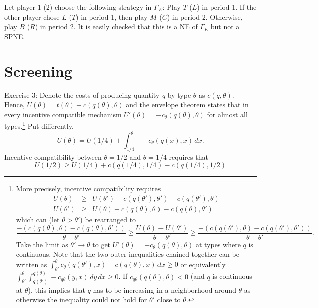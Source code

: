 \documentclass[a4paper,11pt]{article}
\begin{document}
Let player 1 (2) choose the following strategy in $\Gamma_E$: Play $T$ ($L$) in period 1. If the other player chose $L$ ($T$) in period 1, then play $M$ ($C$) in period 2. Otherwise, play $B$ ($R$) in period 2. It is easily checked that this is a NE of $\Gamma_E$ but not a SPNE.

\section{Screening}
\label{sec:screening}

Exercise 3: Denote the costs of producing quantity $q$ by type $\theta $ as $c(q,\theta )$. Hence, $U(\theta )=t(\theta )-c(q(\theta ),\theta )$ and the envelope theorem states that in every incentive compatible mechanism $U'(\theta )=-c_\theta (q(\theta ),\theta )$ for almost all types.\footnote{ More precisely, incentive compatibility requires
  \begin{eqnarray*}
    U(\theta )&\geq& U(\theta ')+c(q(\theta '),\theta ')-c(q(\theta '),\theta )\\
    U(\theta' )&\geq& U(\theta )+c(q(\theta ),\theta )-c(q(\theta ),\theta' )
  \end{eqnarray*}
  which can (let $\theta >\theta '$) be rearranged to
  \begin{equation*}
    \frac{-(c(q(\theta ),\theta )-c(q(\theta ),\theta'))}{\theta -\theta'} \geq \frac{U(\theta )-U(\theta')}{\theta -\theta '}\geq \frac{-(c(q(\theta '),\theta )-c(q(\theta '),\theta '))}{\theta -\theta'}.
  \end{equation*}
   Take the limit as $\theta '\rightarrow\theta $ to get $U'(\theta )=-c_\theta (q(\theta ),\theta )$ at types where $q$ is continuous. Note that the two outer inequalities chained together can be written as $\int_{\theta '}^\theta  c_\theta (q(\theta '),x)-c(q(\theta ),x)\,dx\geq 0$ or equivalently $\int_{\theta '}^\theta \int_{q(\theta ')}^{q(\theta )}-c_{q\theta }(y,x)\,dy\,dx\geq 0$. If $c_{q\theta }(q(\theta ),\theta )<0$ (and $q$ is continuous at $\theta $), this implies that $q$ has to be increasing in a neighborhood around $\theta $ as otherwise the inequality could not hold for $\theta '$ close to $\theta $.
}
  Put differently,
\begin{equation*}
  U(\theta )=U(1/4)+\int_{1/4}^\theta -c_\theta (q(x),x)\,dx.
\end{equation*}
Incentive compatibility between $\theta =1/2$ and $\theta =1/4$ requires that 
\begin{equation*}
  U(1/2)\geq U(1/4)+c(q(1/4),1/4)-c(q(1/4),1/2)
\end{equation*}
\end{document}
